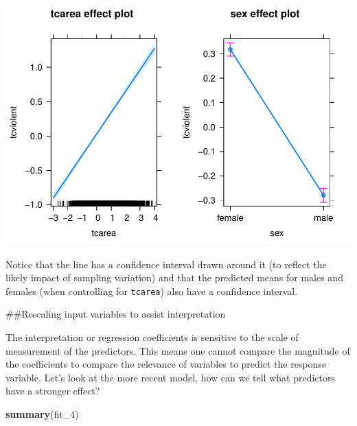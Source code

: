 \documentclass[]{book}
\newenvironment{Shaded}{\begin{snugshade}}{\end{snugshade}}
\newcommand{\DecValTok}[1]{\textcolor[rgb]{0.00,0.00,0.81}{#1}}
\newcommand{\KeywordTok}[1]{\textcolor[rgb]{0.13,0.29,0.53}{\textbf{#1}}}
\newcommand{\NormalTok}[1]{#1}
\theoremstyle{definition}
\theoremstyle{definition}
\theoremstyle{definition}
\theoremstyle{remark}
\begin{document}
\includegraphics{08-regression_files/figure-latex/unnamed-chunk-30-1.pdf}

Notice that the line has a confidence interval drawn around it (to
reflect the likely impact of sampling variation) and that the predicted
means for males and females (when controlling for \texttt{tcarea}) also
have a confidence interval.

\#\#Rescaling input variables to assist interpretation

The interpretation or regression coefficients is sensitive to the scale
of measurement of the predictors. This means one cannot compare the
magnitude of the coefficients to compare the relevance of variables to
predict the response variable. Let's look at the more recent model, how
can we tell what predictors have a stronger effect?

\begin{Shaded}
\begin{Highlighting}[]
\KeywordTok{summary}\NormalTok{(fit_}\DecValTok{4}\NormalTok{)}
\end{Highlighting}
\end{Shaded}
\end{document}
